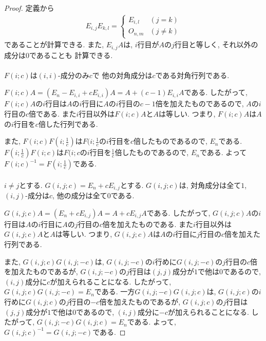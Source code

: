 \begin{proof}
  定義から
  \begin{align*}
    E_{i,j}E_{k,l}=
    \begin{cases}
      E_{i,l}&(j=k)\\
      O_{n,m}&(j\neq k)
    \end{cases}
  \end{align*}
  であることが計算できる.
  また,
  $E_{i,j}A$は, $i$行目が$A$の$j$行目と等しく, それ以外の成分は$0$であることも
  計算できる.
  \paragraph{}
  $F(i;c)$は$(i,i)$-成分のみ$c$で
  他の対角成分は$c$である対角行列である.

 
  $F(i;c)A=(E_n-E_{i,i}+cE_{i,i})A=A+(c-1)E_{i,i}A$である.
  したがって, $F(i;c)A$の$i$行目は$A$の$i$行目に$A$の$i$行目の$c-1$倍を加えたものであるので,
  $A$の$i$行目の$c$倍である.
  また$i$行目以外は$F(i;c)A$と$A$は等しい.
  つまり,
  $F(i;c)A$は$A$の$i$行目を$c$倍した行列である.

  また, $F(i;c)F(i;\frac{1}{c})$は$F(i;\frac{1}{c}$の$i$行目を$c$倍したものであるので,
  $E_n$である.
  $F(i;\frac{1}{c})F(i;c)$は$F(i;c$の$i$行目を$\frac{1}{c}$倍したものであるので,
  $E_n$である.
  よって$F(i;c)^{-1}=F(i;\frac{1}{c})$である.

  \paragraph{}
  $i\neq j$とする. $G(i,j;c)=E_n+cE_{i,j}$とする.
  $G(i,j;c)$は, 対角成分は全て$1$, $(i,j)$-成分は$c$, 他の成分は全て$0$である.

  $G(i,j;c)A=(E_n+cE_{i,j})A=A+cE_{i,j}A$である.
  したがって, $G(i,j;c)A$の$i$行目は$A$の$i$行目に$A$の$j$行目の$c$倍を加えたものである.
  また$i$行目以外は$G(i,j;c)A$と$A$は等しい.
  つまり, $G(i,j;c)A$は$A$の$i$行目に$j$行目の$c$倍を加えた行列である.

  また, $G(i,j;c)G(i,j;-c)$は, $G(i,j;-c)$の$i$行めに$G(i,j;-c)$の$j$行目の$c$倍を加えたものであるが, $G(i,j;-c)$の$j$行目は$(j,j)$成分が$1$で他は$0$であるので,
  $(i,j)$成分に$c$が加えられることになる.
  したがって, $G(i,j;c)G(i,j;-c)=E_n$である.
  一方$G(i,j;-c)G(i,j;c)$は, $G(i,j;c)$の$i$行めに$G(i,j;c)$の$j$行目の$-c$倍を加えたものであるが, $G(i,j;c)$の$j$行目は$(j,j)$成分が$1$で他は$0$であるので,
  $(i,j)$成分に$-c$が加えられることになる.
  したがって, $G(i,j;-c)G(i,j;c)=E_n$である.
  よって, $G(i,j;c)^{-1}=G(i,j;-c)$である.
  

\end{proof}
